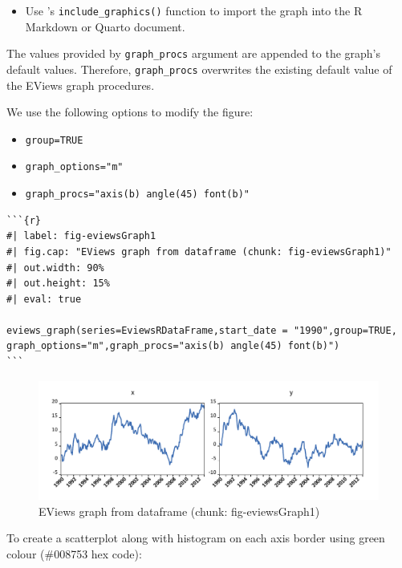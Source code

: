 \begin{itemize}
\tightlist
\item
  Use 's \texttt{include\_graphics()} function to import the graph into the R Markdown or Quarto document.
\end{itemize}

The values provided by \texttt{graph\_procs} argument are appended to the graph's default values. Therefore, \texttt{graph\_procs} overwrites the existing default value of the EViews graph procedures.

We use the following options to modify the figure:

\begin{itemize}
\tightlist
\item
  \texttt{group=TRUE}
\item
  \texttt{graph\_options="m"}
\item
  \texttt{graph\_procs="axis(b)\ angle(45)\ font(b)"}
\end{itemize}

\begin{verbatim}
```{r} 
#| label: fig-eviewsGraph1
#| fig.cap: "EViews graph from dataframe (chunk: fig-eviewsGraph1)"
#| out.width: 90%
#| out.height: 15%
#| eval: true

eviews_graph(series=EviewsRDataFrame,start_date = "1990",group=TRUE,
graph_options="m",graph_procs="axis(b) angle(45) font(b)")
```
\end{verbatim}

\begin{figure}

{\centering \includegraphics[width=0.9\linewidth,height=0.15\textheight]{figures/eviewsgraph1-eviewsgraph1-xy} 

}

\caption{EViews graph from dataframe (chunk: fig-eviewsGraph1)}\label{fig:fig-eviewsGraph1}
\end{figure}

To create a scatterplot along with histogram on each axis border using green colour (\#008753 hex code):

